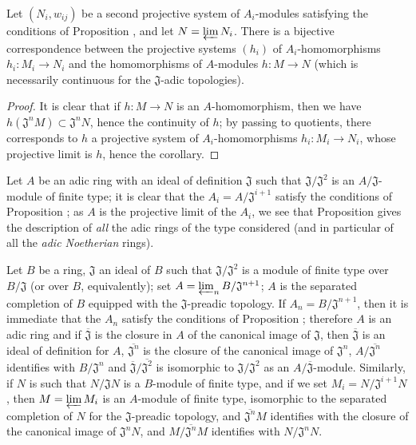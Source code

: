 \begin{corollary}[7.2.10]
\label{0.7.2.10}
Let $(N_i,w_{ij})$ be a second projective system of $A_i$-modules satisfying the conditions
of Proposition , and let $N=\varprojlim N_i$. There is a
bijective correspondence between the projective systems $(h_i)$ of $A_i$-homomorphisms
$h_i:M_i\to N_i$ and the homomorphisms of $A$-modules $h:M\to N$ (which is necessarily
continuous for the $\mathfrak{J}$-adic topologies).
\end{corollary}

\begin{proof}
\label{proof-0.7.2.10}
It is clear that if $h:M\to N$ is an $A$-homomorphism, then we have
$h(\mathfrak{J}^n M)\subset\mathfrak{J}^n N$, hence the continuity of $h$; by passing to
quotients, there corresponds to $h$ a projective system of $A_i$-homomorphisms
$h_i:M_i\to N_i$, whose projective limit is $h$, hence the corollary.
\end{proof}

\begin{remark}[7.2.11]
\label{0.7.2.11}
Let $A$ be an adic ring with an ideal of definition $\mathfrak{J}$ such that
$\mathfrak{J}/\mathfrak{J}^2$ is an $A/\mathfrak{J}$-module of finite type; it is clear
that the $A_i=A/\mathfrak{J}^{i+1}$ satisfy
the conditions of Proposition ; as $A$ is the projective
limit of the $A_i$, we see that Proposition  gives the
description of \emph{all} the adic rings of the type considered (and in particular of all
the \emph{adic Noetherian} rings).
\end{remark}

\begin{example}[7.2.12]
\label{0.7.2.12}
Let $B$ be a ring, $\mathfrak{J}$ an ideal of $B$ such that $\mathfrak{J}/\mathfrak{J}^2$ is
a module of finite type over $B/\mathfrak{J}$ (or over $B$, equivalently); set
$A=\varprojlim_n B/\mathfrak{J}^{n+1}$; $A$ is the separated completion of $B$ equipped with
the $\mathfrak{J}$-preadic topology. If $A_n=B/\mathfrak{J}^{n+1}$, then it is immediate
that the $A_n$ satisfy the conditions of Proposition ;
therefore $A$ is an adic ring and if $\overline{\mathfrak{J}}$ is the closure in $A$ of the
canonical image of $\mathfrak{J}$, then $\overline{\mathfrak{J}}$ is an ideal of definition
for $A$, $\overline{\mathfrak{J}^n}$ is the closure of the canonical image of
$\mathfrak{J}^n$, $A/\overline{\mathfrak{J}^n}$ identifies with $B/\mathfrak{J}^n$ and
$\overline{\mathfrak{J}}/\overline{\mathfrak{J}^2}$ is isomorphic to
$\mathfrak{J}/\mathfrak{J}^2$ as an $A/\overline{\mathfrak{J}}$-module. Similarly, if $N$
is such that $N/\mathfrak{J}N$ is a $B$-module of finite type, and if we set
$M_i=N/\mathfrak{J}^{i+1}N$, then $M=\varprojlim M_i$ is an $A$-module of finite type,
isomorphic to the separated completion of $N$ for the $\mathfrak{J}$-preadic topology, and
$\overline{\mathfrak{J}^n}M$ identifies with the closure of the canonical image of
$\mathfrak{J}^n N$, and $M/\overline{\mathfrak{J}^n}M$ identifies with
$N/\mathfrak{J}^n N$.
\end{example}

